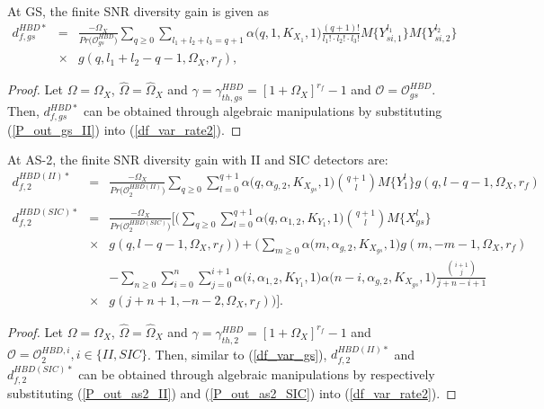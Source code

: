 \begin{theorem}
At GS, the finite SNR diversity gain is given as
\begin{eqnarray} \label{df_var_gs}
d_{f,gs}^{HBD*} & = & \frac{-\Omega_X}{Pr\big(\mathcal{O}_{gs}^{HBD}\big)} \sum_{q\geq0}\sum_{l_1+l_2+l_3=q+1} \alpha\big(q,1,K_{X_1},1\big) \frac{(q+1)!}{l_1! \cdot l_2! \cdot l_3!} M\{Y_{si,1}^{l_1}\} M\{Y_{si,2}^{l_2}\} \nonumber\\
& \times & g(q,l_1+l_2-q-1,\Omega_X,r_f),
\end{eqnarray}
\end{theorem}
\begin{proof}
Let $\Omega=\Omega_X$, $\widehat{\Omega}=\widehat{\Omega}_X$ and $\gamma = \gamma_{th,gs}^{HBD}=[1+\Omega_X]^{r_f}-1$ and $\mathcal{O} = \mathcal{O}_{gs}^{HBD}$. Then, $d_{f,gs}^{HBD*}$ can be obtained through algebraic manipulations by substituting (\ref{P_out_gs_II}) into (\ref{df_var_rate2}).
\end{proof}

\begin{theorem}
At AS-2, the finite SNR diversity gain with II and SIC detectors are:
\begin{eqnarray} 
d_{f,2}^{HBD(II)*} & = & \frac{-\Omega_X}{Pr\big(\mathcal{O}_{2}^{HBD(II)}\big)} \sum_{q\geq0} \sum_{l=0}^{q+1} \alpha\big(q,\alpha_{g,2}, K_{X_{gs}}, 1\big) \binom{q+1}{l} M\{Y_1^l\} g(q,l-q-1,\Omega_X,r_f) \label{df_var_AS2_II} \nonumber\\
& & \\
d_{f,2}^{HBD(SIC)*} & = & \frac{-\Omega_X}{Pr\big(\mathcal{O}_{2}^{HBD(SIC)}\big)} \Bigg[ \Bigg(\sum_{q\geq0}\sum_{l=0}^{q+1} \alpha\big(q,\alpha_{1,2},K_{Y_{1}},1\big) \binom{q+1}{l} M\{X_{gs}^l\} \nonumber\\
& \times &  g(q,l-q-1,\Omega_X,r_f)\Bigg) + \Bigg( \sum_{m\geq0} \alpha\big(m,\alpha_{g,2},K_{X_{gs}},1\big) g(m,-m-1,\Omega_X,r_f) \nonumber\\
& & - \sum_{n\geq0}\sum_{i=0}^{n}\sum_{j=0}^{i+1} \alpha\big(i,\alpha_{1,2},K_{Y_{1}},1\big) \alpha\big(n-i,\alpha_{g,2},K_{X_{gs}},1\big) \frac{\binom{i+1}{j}}{j+n-i+1} \nonumber\\
& \times &  g(j+n+1,-n-2,\Omega_X,r_f) \Bigg) \Bigg]. \label{df_var_AS2_SIC}
\end{eqnarray}
\end{theorem}
\begin{proof}
Let $\Omega=\Omega_X$, $\widehat{\Omega}=\widehat{\Omega}_X$ and $\gamma=\gamma_{th,2}^{HBD}=[1+\Omega_X]^{r_f}-1$ and $\mathcal{O} = \mathcal{O}_{2}^{HBD,i}, i \in \{II,SIC\}$. Then, similar to (\ref{df_var_gs}), $d_{f,2}^{HBD(II)*}$ and $d_{f,2}^{HBD(SIC)*}$ can be obtained through algebraic manipulations by respectively substituting (\ref{P_out_as2_II}) and (\ref{P_out_as2_SIC}) into (\ref{df_var_rate2}). 
\end{proof}

